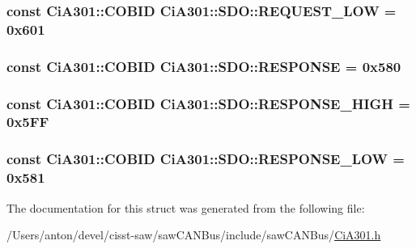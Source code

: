 \subsubsection[{R\+E\+Q\+U\+E\+S\+T\+\_\+\+L\+O\+W}]{\setlength{\rightskip}{0pt plus 5cm}const {\bf Ci\+A301\+::\+C\+O\+B\+I\+D} Ci\+A301\+::\+S\+D\+O\+::\+R\+E\+Q\+U\+E\+S\+T\+\_\+\+L\+O\+W = 0x601\hspace{0.3cm}{\ttfamily [static]}}\label{struct_ci_a301_1_1_s_d_o_ab64717b4ca5b6da42af0599ef2ce4b8e}
\hypertarget{struct_ci_a301_1_1_s_d_o_a07a9b6fd21e38720d34acd0ad570f405}{}
\subsubsection[{R\+E\+S\+P\+O\+N\+S\+E}]{\setlength{\rightskip}{0pt plus 5cm}const {\bf Ci\+A301\+::\+C\+O\+B\+I\+D} Ci\+A301\+::\+S\+D\+O\+::\+R\+E\+S\+P\+O\+N\+S\+E = 0x580\hspace{0.3cm}{\ttfamily [static]}}\label{struct_ci_a301_1_1_s_d_o_a07a9b6fd21e38720d34acd0ad570f405}
\hypertarget{struct_ci_a301_1_1_s_d_o_aef5fb9c8aa9d87537b049f57fe4bcd53}{}
\subsubsection[{R\+E\+S\+P\+O\+N\+S\+E\+\_\+\+H\+I\+G\+H}]{\setlength{\rightskip}{0pt plus 5cm}const {\bf Ci\+A301\+::\+C\+O\+B\+I\+D} Ci\+A301\+::\+S\+D\+O\+::\+R\+E\+S\+P\+O\+N\+S\+E\+\_\+\+H\+I\+G\+H = 0x5\+F\+F\hspace{0.3cm}{\ttfamily [static]}}\label{struct_ci_a301_1_1_s_d_o_aef5fb9c8aa9d87537b049f57fe4bcd53}
\hypertarget{struct_ci_a301_1_1_s_d_o_a4d1cfd74034335f16b43a11f8e804029}{}
\subsubsection[{R\+E\+S\+P\+O\+N\+S\+E\+\_\+\+L\+O\+W}]{\setlength{\rightskip}{0pt plus 5cm}const {\bf Ci\+A301\+::\+C\+O\+B\+I\+D} Ci\+A301\+::\+S\+D\+O\+::\+R\+E\+S\+P\+O\+N\+S\+E\+\_\+\+L\+O\+W = 0x581\hspace{0.3cm}{\ttfamily [static]}}\label{struct_ci_a301_1_1_s_d_o_a4d1cfd74034335f16b43a11f8e804029}


The documentation for this struct was generated from the following file\+:\begin{DoxyCompactItemize}
\item 
/\+Users/anton/devel/cisst-\/saw/saw\+C\+A\+N\+Bus/include/saw\+C\+A\+N\+Bus/\hyperlink{_ci_a301_8h}{Ci\+A301.\+h}\end{DoxyCompactItemize}
